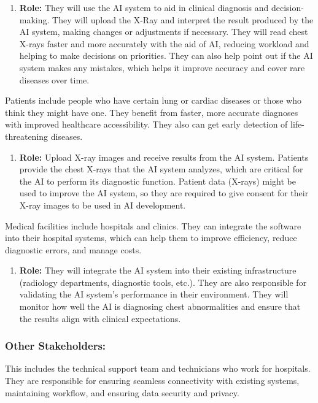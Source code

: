\documentclass[12pt]{article}
\begin{document}
\begin{enumerate}
\item \textbf{Role:} They will use the AI system to aid in clinical diagnosis and decision-making. They will upload the X-Ray and interpret the result produced by the AI system, making changes or adjustments if necessary. They will read chest X-rays faster and more accurately with the aid of AI, reducing workload and helping to make decisions on priorities. They can also help point out if the AI system makes any mistakes, which helps it improve accuracy and cover rare diseases over time.
\end{enumerate}
Patients include people who have certain lung or cardiac diseases or those who think they might have one. They benefit from faster, more accurate diagnoses with improved healthcare accessibility. They also can get early detection of life-threatening diseases.

\begin{enumerate}
\item \textbf{Role:} Upload X-ray images and receive results from the AI system. Patients provide the chest X-rays that the AI system analyzes, which are critical for the AI to perform its diagnostic function. Patient data (X-rays) might be used to improve the AI system, so they are required to give consent for their X-ray images to be used in AI development.
\end{enumerate}
Medical facilities include hospitals and clinics. They can integrate the software into their hospital systems, which can help them to improve efficiency, reduce diagnostic errors, and manage costs.

\begin{enumerate}
\item \textbf{Role:} They will integrate the AI system into their existing infrastructure (radiology departments, diagnostic tools, etc.). They are also responsible for validating the AI system's performance in their environment. They will monitor how well the AI is diagnosing chest abnormalities and ensure that the results align with clinical expectations.
\end{enumerate}

\subsubsection{Other Stakeholders:}
This includes the technical support team and technicians who work for hospitals. They are responsible for ensuring seamless connectivity with existing systems, maintaining workflow, and ensuring data security and privacy.
\end{document}
